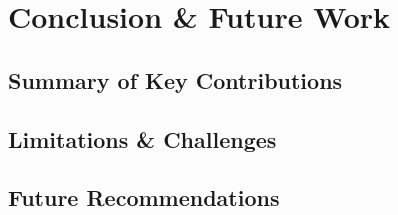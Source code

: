 \chapter{Conclusion \& Future Work}
\label{chap:conclusion}

\section{Summary of Key Contributions}

\section{Limitations \& Challenges}

\section{Future Recommendations}
